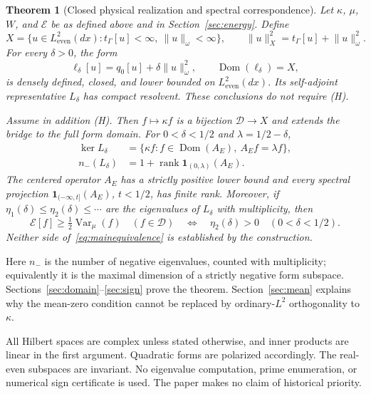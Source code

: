 \documentclass[11pt,a4paper]{article}
\numberwithin{equation}{section}
\newtheorem{theorem}{Theorem}[section]
\theoremstyle{definition}
\theoremstyle{remark}
\newcommand{\E}{\mathcal E}
\newcommand{\D}{\mathcal D}
\newcommand{\Le}{L^2_{\mathrm{even}}(dx)}
\newcommand{\tg}{t_{\Gamma}}
\newcommand{\dom}{\operatorname{Dom}}
\newcommand{\Var}{\operatorname{Var}}
\newcommand{\rank}{\operatorname{rank}}
\newcommand{\norm}[1]{\lVert #1\rVert}
\newcommand{\one}{\mathbf 1}
\begin{document}
\begin{theorem}[Closed physical realization and spectral correspondence]\label{thm:main}
Let $\kappa$, $\mu$, $W$, and $\E$ be as defined above and in Section~\ref{sec:energy}. Define
\begin{equation}\label{eq:X}
 X=\{u\in\Le:\tg[u]<\infty,\ \norm{u}_\omega<\infty\},\qquad
 \norm{u}_X^2=\tg[u]+\norm{u}_\omega^2.
\end{equation}
For every $\delta>0$, the form
\begin{equation}\label{eq:ell}
 \ell_\delta[u]=q_0[u]+\delta\norm{u}_\omega^2,
 \qquad\dom(\ell_\delta)=X,
\end{equation}
is densely defined, closed, and lower bounded on $\Le$. Its self-adjoint representative $L_\delta$ has compact resolvent. These conclusions do not require \textup{(H)}.

Assume in addition \textup{(H)}. Then $f\mapsto\kappa f$ is a bijection $\D\to X$ and extends the bridge to the full form domain. For $0<\delta<1/2$ and $\lambda=1/2-\delta$,
\begin{align}
 \ker L_\delta
 &=\{\kappa f:f\in\dom(A_E),\ A_Ef=\lambda f\},\label{eq:mainkernel}\\
 n_-(L_\delta)
 &=1+\rank\one_{(0,\lambda)}(A_E).\label{eq:mainindex}
\end{align}
The centered operator $A_E$ has a strictly positive lower bound and every spectral projection $\one_{(-\infty,t]}(A_E)$, $t<1/2$, has finite rank. Moreover, if $\eta_1(\delta)\le\eta_2(\delta)\le\cdots$ are the eigenvalues of $L_\delta$ with multiplicity, then
\begin{equation}\label{eq:mainequivalence}
 \E[f]\ge\tfrac12\Var_\mu(f)\quad(f\in\D)
 \quad\Longleftrightarrow\quad
 \eta_2(\delta)>0\quad(0<\delta<1/2).
\end{equation}
Neither side of~\eqref{eq:mainequivalence} is established by the construction.
\end{theorem}

Here $n_-$ is the number of negative eigenvalues, counted with multiplicity; equivalently it is the maximal dimension of a strictly negative form subspace. Sections~\ref{sec:domain}--\ref{sec:sign} prove the theorem. Section~\ref{sec:mean} explains why the mean-zero condition cannot be replaced by ordinary-$L^2$ orthogonality to $\kappa$.

All Hilbert spaces are complex unless stated otherwise, and inner products are linear in the first argument. Quadratic forms are polarized accordingly. The real-even subspaces are invariant. No eigenvalue computation, prime enumeration, or numerical sign certificate is used. The paper makes no claim of historical priority.
\end{document}

